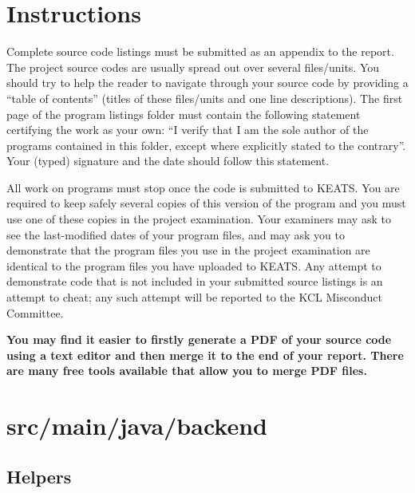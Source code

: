 \section{Instructions}
Complete source code listings must be submitted as an appendix to the report. The project source codes are usually spread out over several files/units. You should try to help the reader to navigate through your source code by providing a ``table of contents'' (titles of these files/units and one line descriptions). The first page of the program listings folder must contain the following statement certifying the work as your own: ``I verify that I am the sole author of the programs contained in this folder, except where explicitly stated to the contrary''. Your (typed) signature and the date should follow this statement.

All work on programs must stop once the code is submitted to KEATS. You are required to keep safely several copies of this version of the program and you must use one of these copies in the project examination. Your examiners may ask to see the last-modified dates of your program files, and may ask you to demonstrate that the program files you use in the project examination are identical to the program files you have uploaded to KEATS. Any attempt to demonstrate code that is not included in your submitted source listings is an attempt to cheat; any such attempt will be reported to the KCL Misconduct Committee.

\textbf{You may find it easier to firstly generate a PDF of your source code using a text editor and then merge it to the end of your report. There are many free tools available that allow you to merge PDF files.}

\section{src/main/java/backend}
\subsection{Helpers}
